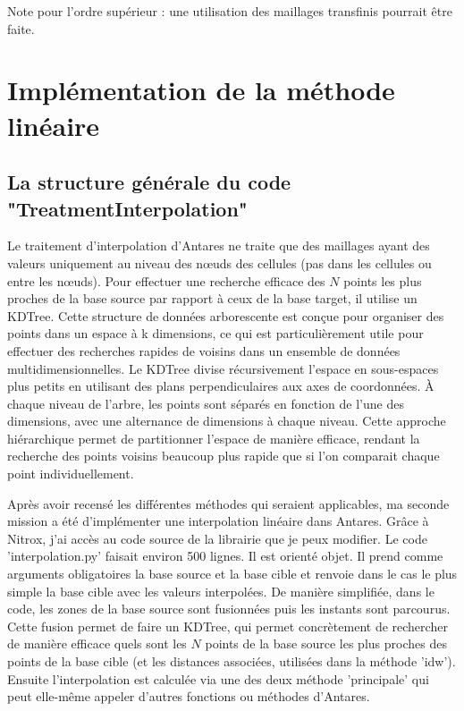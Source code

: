 Note pour l'ordre supérieur : une utilisation des maillages transfinis pourrait être faite\cite{camarero2024}.




\newpage
\section{Implémentation de la méthode linéaire}

\subsection{La structure générale du code "TreatmentInterpolation"}

Le traitement d'interpolation d'Antares ne traite que des maillages ayant des valeurs uniquement au niveau des nœuds des cellules (pas dans les cellules ou entre les nœuds).
Pour effectuer une recherche efficace des \(N\) points les plus proches de la base source par rapport à ceux de la base target, il utilise un \ac{KDTree}. Cette structure de données arborescente est conçue pour organiser des points dans un espace à k dimensions, ce qui est particulièrement utile pour effectuer des recherches rapides de voisins dans un ensemble de données multidimensionnelles.
Le KDTree divise récursivement l'espace en sous-espaces plus petits en utilisant des plans perpendiculaires aux axes de coordonnées. À chaque niveau de l'arbre, les points sont séparés en fonction de l'une des dimensions, avec une alternance de dimensions à chaque niveau. Cette approche hiérarchique permet de partitionner l'espace de manière efficace, rendant la recherche des points voisins beaucoup plus rapide que si l'on comparait chaque point individuellement.



Après avoir recensé les différentes méthodes qui seraient applicables, ma seconde mission a été d'implémenter une interpolation linéaire dans Antares. Grâce à Nitrox, j'ai accès au code source de la librairie que je peux modifier. Le code 'interpolation.py' faisait environ 500 lignes. Il est orienté objet. 
Il prend comme arguments obligatoires la base source et la base cible et renvoie dans le cas le plus simple la base cible avec les valeurs interpolées.
De manière simplifiée, dans le code, les zones de la base source sont fusionnées puis les instants sont parcourus. 
Cette fusion permet de faire un KDTree, qui permet concrètement de rechercher de manière efficace quels sont les \( N \) points de la base source les plus proches des points de la base cible (et les distances associées, utilisées dans la méthode 'idw').
Ensuite l'interpolation est calculée via une des deux méthode 'principale' qui peut elle-même appeler d'autres fonctions ou méthodes d'Antares. %



